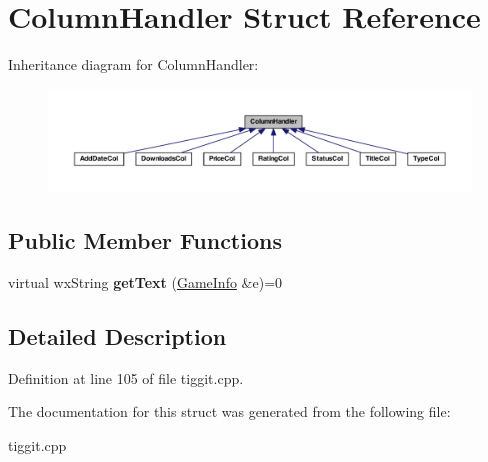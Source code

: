 \hypertarget{struct_column_handler}{\section{Column\-Handler Struct Reference}
\label{struct_column_handler}
}


Inheritance diagram for Column\-Handler\-:
\nopagebreak
\begin{figure}[H]
\begin{center}
\leavevmode
\includegraphics[width=350pt]{struct_column_handler__inherit__graph}
\end{center}
\end{figure}
\subsection*{Public Member Functions}
\begin{DoxyCompactItemize}
\item 
\hypertarget{struct_column_handler_acc8693935219ae4e189b9b862e2c735d}{virtual wx\-String {\bfseries get\-Text} (\hyperlink{struct_game_info}{Game\-Info} \&e)=0}\label{struct_column_handler_acc8693935219ae4e189b9b862e2c735d}

\end{DoxyCompactItemize}


\subsection{Detailed Description}


Definition at line 105 of file tiggit.\-cpp.



The documentation for this struct was generated from the following file\-:\begin{DoxyCompactItemize}
\item 
tiggit.\-cpp\end{DoxyCompactItemize}
